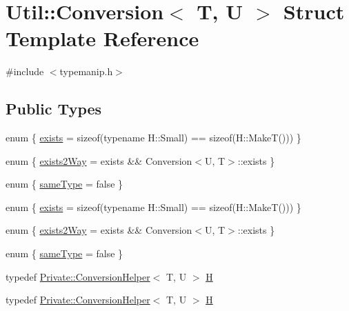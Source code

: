 \hypertarget{structUtil_1_1Conversion}{}\section{Util\+:\+:Conversion$<$ T, U $>$ Struct Template Reference}
\label{structUtil_1_1Conversion}


{\ttfamily \#include $<$typemanip.\+h$>$}

\subsection*{Public Types}
\begin{DoxyCompactItemize}
\item 
enum \{ \mbox{\hyperlink{structUtil_1_1Conversion_a0afeebd8eb1397aae8486da9e36def56a66cec7f52af17b9d2055795f332f3435}{exists}} = sizeof(typename H\+:\+:Small) == sizeof(H\+:\+:MakeT()))
 \}
\item 
enum \{ \mbox{\hyperlink{structUtil_1_1Conversion_a95643f0bc1319702bcb44f0653b2cb07a57b873c1826056eca5f6fb7d56ccb11f}{exists2\+Way}} = exists \&\& Conversion$<$U, T$>$\+:\+:exists
 \}
\item 
enum \{ \mbox{\hyperlink{structUtil_1_1Conversion_a780137e87b1d6a9d74fbd3779f0db8a9a13c57e92754abd0dafc432097f46553d}{same\+Type}} = false
 \}
\item 
enum \{ \mbox{\hyperlink{structUtil_1_1Conversion_a0afeebd8eb1397aae8486da9e36def56a66cec7f52af17b9d2055795f332f3435}{exists}} = sizeof(typename H\+:\+:Small) == sizeof(H\+:\+:MakeT()))
 \}
\item 
enum \{ \mbox{\hyperlink{structUtil_1_1Conversion_a95643f0bc1319702bcb44f0653b2cb07a57b873c1826056eca5f6fb7d56ccb11f}{exists2\+Way}} = exists \&\& Conversion$<$U, T$>$\+:\+:exists
 \}
\item 
enum \{ \mbox{\hyperlink{structUtil_1_1Conversion_a780137e87b1d6a9d74fbd3779f0db8a9a13c57e92754abd0dafc432097f46553d}{same\+Type}} = false
 \}
\item 
typedef \mbox{\hyperlink{structUtil_1_1Private_1_1ConversionHelper}{Private\+::\+Conversion\+Helper}}$<$ T, U $>$ \mbox{\hyperlink{structUtil_1_1Conversion_a2f11e8da88ca0599a47c7d9fcc3ff2f2}{H}}
\item 
typedef \mbox{\hyperlink{structUtil_1_1Private_1_1ConversionHelper}{Private\+::\+Conversion\+Helper}}$<$ T, U $>$ \mbox{\hyperlink{structUtil_1_1Conversion_a2f11e8da88ca0599a47c7d9fcc3ff2f2}{H}}
\end{DoxyCompactItemize}


